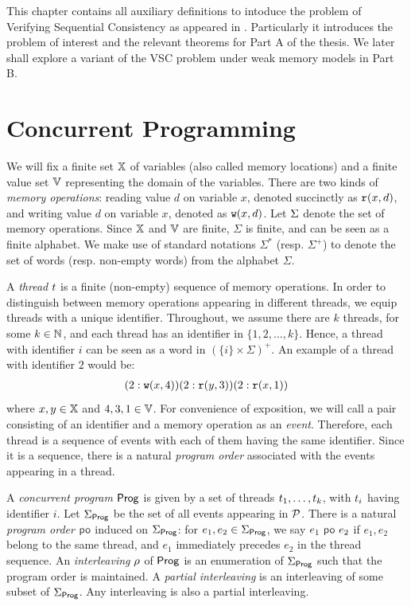 This chapter contains all auxiliary definitions to intoduce  the problem of Verifying  Sequential Consistency as appeared in \cite{gibbons}. Particularly it introduces the problem of interest and the relevant theorems for Part A of the thesis. We later shall explore a variant of the VSC problem under weak memory models in Part B. 


\section{Concurrent Programming}

We will fix a finite set ${\mathbb X}$ of variables (also called memory locations) and a finite value set ${\mathbb V}$ representing the domain of the variables. There are two kinds of \emph{memory operations}: reading value $d$ on variable $x$, denoted succinctly as $\mathtt{r}(x, d)$, and writing value $d$ on variable $x$, denoted as $\mathtt{w}(x, d)$. Let $\Sigma$ denote the set of memory operations. Since ${\mathbb X}$ and ${\mathbb V}$ are finite, $\Sigma$ is finite, and can be seen as a finite alphabet. We make use of standard notations $\Sigma^*$ (resp. $\Sigma^+$) to denote the set of words (resp. non-empty words) from the alphabet $\Sigma$. 

 A \emph{thread} $t$ is a finite (non-empty) sequence of memory operations. In order to distinguish between memory operations appearing in different threads, we equip threads with a unique identifier. Throughout, we assume there are $k$ threads, for some $k \in \mathbb{N}$, and each thread has an identifier in $\{1, 2, \dots, k\}$. Hence, a thread with identifier $i$ can be seen as a word in $(\{i\} \times \Sigma)^+$. An example of a thread with identifier $2$ would be: 
\begin{align*}
(2: \mathtt{w}(x, 4)) (2: \mathtt{r}(y, 3)) (2: \mathtt{r}(x, 1))
\end{align*}
where $x, y \in {\mathbb X}$ and $4, 3, 1 \in {\mathbb V}$. For convenience of exposition, we will call a pair consisting of an identifier and a memory operation as an \emph{event}. Therefore, each thread is a sequence of events with each of them having the same identifier. Since it is a sequence, there is a natural \emph{program order} associated with the events appearing in a thread.

\smallskip 

 A \emph{concurrent program} $\mathsf{Prog}$ is given by a set of threads $t_1, \dots, t_k$, with $t_i$ having identifier $i$. Let $\Sigma_{\mathsf{Prog}}$ be the set of all events appearing in ${\mathcal P}$.  There is a natural \emph{program order} $\po$ induced on $\Sigma_{\mathsf{Prog}}$: for $e_1, e_2 \in \Sigma_{\mathsf{Prog}}$, we say $e_1~\po~e_2$ if $e_1, e_2$ belong to the same thread, and $e_1$ immediately precedes $e_2$ in the thread sequence. An \emph{interleaving} $\rho$ of $\mathsf{Prog}$ is an enumeration of $\Sigma_{\mathsf{Prog}}$ such that the program order is maintained. A \emph{partial interleaving} is an interleaving of some subset of $\Sigma_{\mathsf{Prog}}$. Any interleaving is also a partial interleaving.


